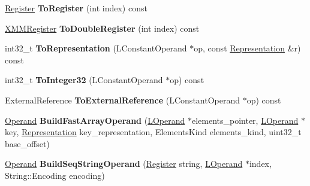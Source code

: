 \begin{DoxyCompactItemize}
\item 
\hyperlink{structv8_1_1internal_1_1_register}{Register} {\bfseries To\+Register} (int index) const \hypertarget{classv8_1_1internal_1_1_l_code_gen_ae4d98c4f4146a2d8ea844342a5bae0ea}{}\label{classv8_1_1internal_1_1_l_code_gen_ae4d98c4f4146a2d8ea844342a5bae0ea}

\item 
\hyperlink{structv8_1_1internal_1_1_double_register}{X\+M\+M\+Register} {\bfseries To\+Double\+Register} (int index) const \hypertarget{classv8_1_1internal_1_1_l_code_gen_a352c288a64a7ad764cd7521780fa6f73}{}\label{classv8_1_1internal_1_1_l_code_gen_a352c288a64a7ad764cd7521780fa6f73}

\item 
int32\+\_\+t {\bfseries To\+Representation} (L\+Constant\+Operand $\ast$op, const \hyperlink{classv8_1_1internal_1_1_representation}{Representation} \&r) const \hypertarget{classv8_1_1internal_1_1_l_code_gen_a0e99f5084c7765aa53aa0537c112b4f1}{}\label{classv8_1_1internal_1_1_l_code_gen_a0e99f5084c7765aa53aa0537c112b4f1}

\item 
int32\+\_\+t {\bfseries To\+Integer32} (L\+Constant\+Operand $\ast$op) const \hypertarget{classv8_1_1internal_1_1_l_code_gen_a477ff533f07d93b0e1ca5f9290beea36}{}\label{classv8_1_1internal_1_1_l_code_gen_a477ff533f07d93b0e1ca5f9290beea36}

\item 
External\+Reference {\bfseries To\+External\+Reference} (L\+Constant\+Operand $\ast$op) const \hypertarget{classv8_1_1internal_1_1_l_code_gen_a3ca26cfdcbaa03743c656cb06da95f4c}{}\label{classv8_1_1internal_1_1_l_code_gen_a3ca26cfdcbaa03743c656cb06da95f4c}

\item 
\hyperlink{classv8_1_1internal_1_1_operand}{Operand} {\bfseries Build\+Fast\+Array\+Operand} (\hyperlink{classv8_1_1internal_1_1_l_operand}{L\+Operand} $\ast$elements\+\_\+pointer, \hyperlink{classv8_1_1internal_1_1_l_operand}{L\+Operand} $\ast$key, \hyperlink{classv8_1_1internal_1_1_representation}{Representation} key\+\_\+representation, Elements\+Kind elements\+\_\+kind, uint32\+\_\+t base\+\_\+offset)\hypertarget{classv8_1_1internal_1_1_l_code_gen_a96354b52eae3401a603556c6e11b44aa}{}\label{classv8_1_1internal_1_1_l_code_gen_a96354b52eae3401a603556c6e11b44aa}

\item 
\hyperlink{classv8_1_1internal_1_1_operand}{Operand} {\bfseries Build\+Seq\+String\+Operand} (\hyperlink{structv8_1_1internal_1_1_register}{Register} string, \hyperlink{classv8_1_1internal_1_1_l_operand}{L\+Operand} $\ast$index, String\+::\+Encoding encoding)\hypertarget{classv8_1_1internal_1_1_l_code_gen_a267f61edcc17719d1bbbecda994bc6c2}{}\label{classv8_1_1internal_1_1_l_code_gen_a267f61edcc17719d1bbbecda994bc6c2}


\end{DoxyCompactItemize}
